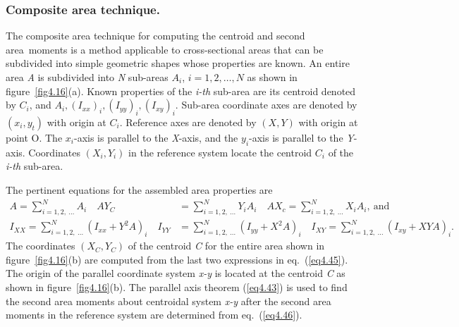 \documentclass{AeroStructure-ERJohnson}
\begin{document}
\subsubsection{Composite area technique.} The composite area technique for computing the centroid and second area~mom\-ents is a method applicable to cross-sectional areas that can be subdivided into simple geometric shapes whose properties are known. An entire area \textit{A} is subdivided into \textit{N} sub-areas $A_{i}$, $i=1,2, \ldots, N$ as shown in figure~\ref{fig4.16}(a). Known properties of the \textit{i-th} sub-area are its centroid denoted by $C_{i}$, and $A_{i},\left(I_{x x}\right)_{i},\left(I_{y y}\right)_{i},\left(I_{x y}\right)_{i}$. Sub-area coordinate axes are denoted by $\left(x_{i}, y_{t}\right)$ with origin at $C_{i}$. Reference axes are denoted by $(X, Y)$ with origin at point O. The $x_i$-axis is parallel to the \textit{X}-axis, and the $y_i$-axis is parallel to the \textit{Y}-axis. Coordinates $\left(X_{i}, Y_{i}\right)$ in the reference system locate the centroid $C_{i}$ of the \textit{i-th} sub-area.

{\def\thefigure{4.16}
}

The pertinent equations for the assembled area properties are
\begin{align}
\label{eq4.45}
A=\sum^{N}_{i=1,2,\ \ldots} A_{i} \quad A Y_{C} &=\sum^{N}_{i=1,2,\ \ldots} Y_{i} A_{i} \quad A X_{c}=\sum^{N}_{i=1,2,\ \ldots} X_{i} A_{i},\ \text{and}\\
I_{X X}=\sum^{N}_{i=1,2,\ \ldots}(I_{x x}+Y^{2} A)_{i} \quad I_{Y Y}&=\sum^{N}_{i=1,2,\ \ldots}(I_{y y}+X^{2} A)_{i} \quad I_{X Y}=\sum^{N}_{i=1,2,\ \ldots}(I_{x y}+X Y A)_{i}.\label{eq4.46}
\end{align}
The coordinates $\left(X_{C}, Y_{C}\right)$ of the centroid \textit{C} for the entire area shown in figure~\ref{fig4.16}(b) are computed from the last two expressions in eq.~(\ref{eq4.45}). The origin of the parallel coordinate system \textit{x-y} is located at the centroid \textit{C} as shown in figure~\ref{fig4.16}(b). The parallel axis theorem (\ref{eq4.43}) is used to find the second area moments about centroidal system \textit{x-y} after the second area moments in the reference system are determined from eq.~(\ref{eq4.46}).
\end{document}
